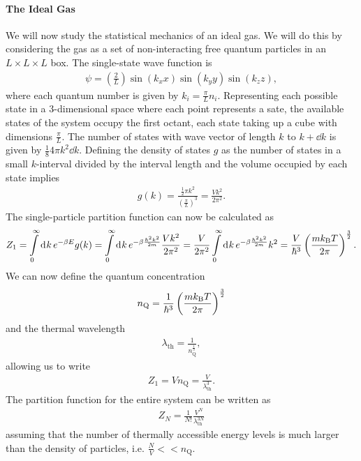 \paragraph{The Ideal Gas}
We will now study the statistical mechanics of an ideal gas. We will do this by considering the gas as a set of non-interacting free quantum particles in an $L\times L\times L$ box. The single-state wave function is
\begin{align*}
	\psi = \left(\frac{2}{L}\right)\sin(k_{x}x)\sin(k_{y}y)\sin(k_{z}z),
\end{align*}
where each quantum number is given by $k_{i} = \frac{\pi}{L}n_{i}$. Representing each possible state in a $3$-dimensional space where each point represents a sate, the available states of the system occupy the first octant, each state taking up a cube with dimensions $\frac{\pi}{L}$. The number of states with wave vector of length $k$ to $k + \dd{k}$ is given by $\frac{1}{8}4\pi k^{2}\dd{k}$. Defining the density of states $g$ as the number of states in a small $k$-interval divided by the interval length and the volume occupied by each state implies 
\begin{align*}
	g(k) = \frac{\frac{1}{2}\pi k^{2}}{\left(\frac{\pi}{L}\right)^{3}} = \frac{Vk^{2}}{2\pi^{2}}.
\end{align*}
The single-particle partition function can now be calculated as
\begin{align*}
	Z_{1} = \int\limits_{0}^{\infty}\dd[]{k}e^{-\beta E}g(k) = \int\limits_{0}^{\infty}\dd[]{k}e^{-\beta\frac{\hbar^{2}k^{2}}{2m}}\frac{Vk^{2}}{2\pi^{2}} = \frac{V}{2\pi^{2}}\int\limits_{0}^{\infty}\dd[]{k}e^{-\beta\frac{\hbar^{2}k^{2}}{2m}}k^{2} = \frac{V}{\hbar^{3}}\left(\frac{mk_{\text{B}} T}{2\pi}\right)^{\frac{3}{2}}.
\end{align*}
We can now define the quantum concentration
\begin{align*}
	n_{\text{Q}} = \frac{1}{\hbar^{3}}\left(\frac{mk_{\text{B}} T}{2\pi}\right)^{\frac{3}{2}}
\end{align*}
and the thermal wavelength
\begin{align*}
	\lambda_{\text{th}} = \frac{1}{n_{\text{Q}}^{\frac{1}{3}}},
\end{align*}
allowing us to write
\begin{align*}
	Z_{1} = Vn_{\text{Q}} = \frac{V}{\lambda_{\text{th}}^{3}}.
\end{align*}
The partition function for the entire system can be written as
\begin{align*}
	Z_{N} = \frac{1}{N!}\frac{V^{N}}{\lambda_{\text{th}}^{3N}}
\end{align*}
assuming that the number of thermally accessible energy levels is much larger than the density of particles, i.e. $\frac{N}{V} << n_{\text{Q}}$.

